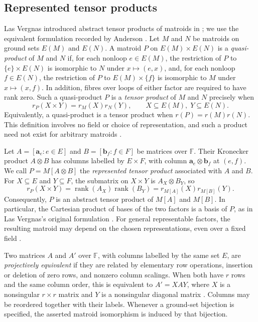 \documentclass[12pt,a4paper]{article}
\numberwithin{equation}{section}
\DeclareMathOperator{\rank}{rank}
\newcommand{\F}{\mathbb F}
\theoremstyle{definition}
\theoremstyle{remark}
\begin{document}
\subsection{Represented tensor products}\label{subsec:tensor-preliminaries}
Las Vergnas introduced abstract tensor products of matroids in \cite{las-vergnas-products}; we use the equivalent formulation recorded
by Anderson \cite[Definition~2.1 and Lemma~2.2]{anderson-matroid-products}.  Let \(M\) and \(N\) be
matroids on ground sets \(E(M)\) and \(E(N)\).  A matroid \(P\) on
\(E(M)\times E(N)\) is a \emph{quasi-product} of \(M\) and \(N\) if, for each
nonloop \(e\in E(M)\), the restriction of \(P\) to
\(\{e\}\times E(N)\) is isomorphic to \(N\) under \(x\mapsto(e,x)\), and, for
each nonloop \(f\in E(N)\), the restriction of \(P\) to
\(E(M)\times\{f\}\) is isomorphic to \(M\) under \(x\mapsto(x,f)\).
In addition, fibres over loops of either factor are required to have rank zero.  Such a
quasi-product \(P\) is a \emph{tensor product} of \(M\) and \(N\) precisely
when
\[
r_P(X\times Y)=r_M(X)r_N(Y),\qquad X\subseteq E(M),\;Y\subseteq E(N).
\]
Equivalently, a quasi-product is a tensor product when \(r(P)=r(M)r(N)\).
This definition involves no field or choice of representation, and
such a product need not exist for arbitrary matroids
\cite[Proposition~2.1]{las-vergnas-products}.

Let \(A=[\boldsymbol{a}_e:e\in E]\) and \(B=[\boldsymbol{b}_f:f\in F]\)
be matrices over \(\F\).  Their Kronecker product \(A\otimes B\)
has columns labelled by \(E\times F\), with column
\(\boldsymbol{a}_e\otimes\boldsymbol{b}_f\) at \((e,f)\).
We call \(P=M[A\otimes B]\) the \emph{represented tensor product}
associated with \(A\) and \(B\).  For \(X\subseteq E\) and
\(Y\subseteq F\), the submatrix on \(X\times Y\) is
\(A_X\otimes B_Y\), so
\[
r_P(X\times Y)=\rank(A_X)\rank(B_Y)=r_{M[A]}(X)r_{M[B]}(Y).
\]
Consequently, \(P\) is an abstract tensor product of \(M[A]\) and
\(M[B]\).  In particular, the Cartesian product of bases of the two
factors is a basis of \(P\), as in Las Vergnas's original formulation
\cite[p.~50]{las-vergnas-products}.
For general representable factors, the resulting matroid may depend
on the chosen representations, even over a fixed field
\cite[Section~2.1]{anderson-matroid-products}.

Two matrices \(A\) and \(A'\) over \(\F\), with columns labelled
by the same set \(E\), are \emph{projectively equivalent} if they are
related by elementary row operations, insertion or deletion of zero
rows, and nonzero column scalings.  When both have \(r\) rows and
the same column order, this is equivalent to \(A'=XAY\), where
\(X\) is a nonsingular \(r\times r\) matrix and \(Y\) is a
nonsingular diagonal matrix \cite[p.~176 and Proposition~6.3.12]{oxley}.
Columns may be reordered together with their labels.  Whenever a
ground-set bijection is specified, the asserted matroid isomorphism
is induced by that bijection.
\end{document}
